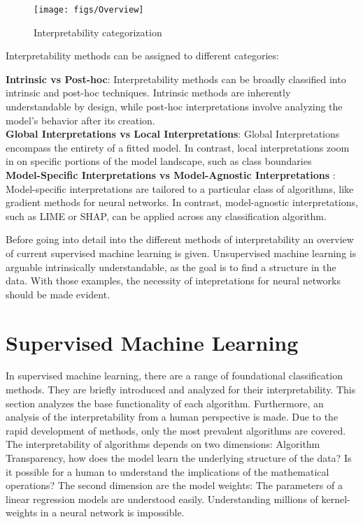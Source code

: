 \begin{figure}[h!]
	\centering
	\texttt{[image: figs/Overview]}
	\caption[Interpretability categorization]{Interpretability categorization \cite{allen2023interpretable}}
	\label{fig:IML_Overview}
\end{figure}

Interpretability methods can be assigned to different categories:

\textbf{Intrinsic vs Post-hoc}: Interpretability methods can be broadly classified into intrinsic and post-hoc techniques. Intrinsic methods are inherently understandable by design, while post-hoc interpretations involve analyzing the model's behavior after its creation.
\\
\textbf{Global Interpretations vs Local Interpretations}\cite{molnar2022}: Global Interpretations encompass the entirety of a fitted model. In contrast, local interpretations zoom in on specific portions of the model landscape, such as class boundaries
\\
\textbf{Model-Specific Interpretations vs Model-Agnostic Interpretations} \cite{molnar2022}: 
Model-specific interpretations are tailored to a particular class of algorithms, like gradient methods for neural networks. In contrast, model-agnostic interpretations, such as LIME or SHAP, can be applied across any classification algorithm.


Before going into detail into the different methods of interpretability an overview of current supervised machine learning is given. Unsupervised machine learning is arguable intrinsically understandable, as the goal is to find a structure in the data. \cite{allen2023interpretable} With those examples, the necessity of intepretations for neural networks should be made evident.

\section{Supervised Machine Learning}

In supervised machine learning, there are a range of foundational classification methods. They are briefly introduced and analyzed for their interpretability. This section analyzes the base functionality of each algorithm. Furthermore, an analysis of the interpretability from a human perspective is made. Due to the rapid development of methods, only the most prevalent algorithms are covered.
\\
The interpretability of algorithms depends on two dimensions: Algorithm Transparency, how does the model learn the underlying structure of the data? Is it possible for a human to understand the implications of the mathematical operations? \cite{molnar2022} The second dimension are the model weights: The parameters of a linear regression models are understood easily. Understanding millions of kernel-weights in a neural network is impossible.

